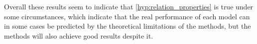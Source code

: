 Overall these results seem to indicate that \autoref{hyp:relation_properties} is true under some circumstances, which indicate that the real performance of each model can in some cases be predicted by the theoretical limitations of the methods, but the methods will also achieve good results despite it.

\begin{comment}
\autoref{tab:relation_properties_icews14_comparison} contains our findings for the dataset ICEWS14. The expected behaviour for DE-TransE is to have a worse score of symmetrical relations as this model cannot model symmetry, as is outlined in \autoref{tab:overview_of_models}. The results indicate that this is not the case -- DE-TransE has a similar overall score on test set $T_S$ as $T_S'$. Most of the models have a better score on $T_S$ however, which indicates that the symmetrical relations are simply easier to predict on for the models than the non-symmetrical ones.

DE-DistMult is expected to have a worse score for anti-symmetry and inversion. This is also not the case, as the score for anti-symmetry is similar to the score for non-antisymmetrical relations on DE-DistMult on dataset ICEWS14. The score for inverse relations are significantly higher than the score for non-inverse relation.

DE-SimplE is expected to combine the best parts of DE-TransE and DE-DistMult, and achieve similar or better results than the two other methods across relation types. This seems to be the case, as DE-Simple has a higher or similar MRR score than the other DE models on every testset.

TeRo seems to have a significantly higher MRR score on symmetrical and inverse relations, and a similar score on anti-symmetrical ranks. ATiSE follows the same pattern. \missing[Write something about TeRo and ATiSE]

TimePlex has a significantly lower score on symmetrical and inverse relations, and a significantly higher score on anti-symmetrical relations. This is the most unique distribution of best results, and might be related to the category of the model, as TimePlex is the only neural network model tested.

\autoref{tab:relation_properties_wikidata12k_comparison} contains our findings for quality of predictions on WIKIDATA. This dataset only has relations that have anti-symmetrical properties among the properties that we inspect, and therefore the figure contains only those findings. The models overall have similar performance across anti-symmetrical relations, which is only surprising on the DE-DistMult method, as this method is not supposed to be able to model anti-symmetry.


\end{comment}
